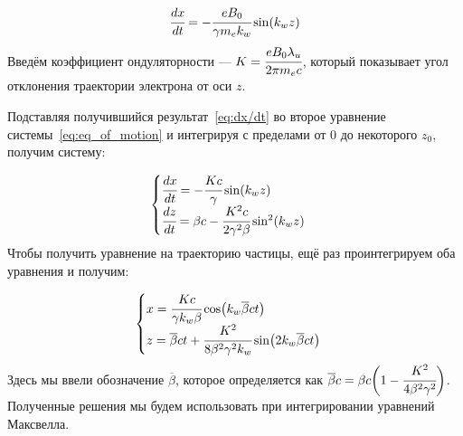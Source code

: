 \begin{equation}
 	\label{eq:dx/dt}
	\cfrac{dx}{dt} = - \cfrac{eB_0}{\gamma m_ek_w} \sin(k_w z)
\end{equation}
Введём коэффициент ондуляторности --- $K = \cfrac{eB_0 \lambda_u}{2 \pi m_e c}$, который показывает угол отклонения траектории электрона от оси $z$. 

Подставляя получившийся результат~\ref{eq:dx/dt} во второе уравнение системы~\ref{eq:eq_of_motion} и интегрируя с пределами от $0$ до некоторого $z_0$, получим систему:

\begin{equation}
	\begin{cases}
	\label{eq:eq_of_motion_velocity}
		\cfrac{dx}{dt} = - \cfrac{Kc}{\gamma} \sin(k_w z)\\
		\cfrac{dz}{dt} = \beta c - \cfrac{K^2 c}{2 \gamma^2 \beta}\sin^2(k_w z)
	\end{cases} 
\end{equation}
Чтобы получить уравнение на траекторию частицы, ещё раз проинтегрируем оба уравнения и получим:

\begin{equation}
	\begin{cases}
	\label{eq:eq_of_motion_trej}
		x = \cfrac{Kc}{\gamma k_w \beta} \cos(k_w\overline{\beta}ct)\\
		z = \overline{\beta}ct + \cfrac{K^2}{8 \beta^2 \gamma^2 k_w}\sin(2k_w\overline{\beta}ct) 
	\end{cases} 
\end{equation}
Здесь мы ввели обозначение $\overline{\beta}$, которое определяется как $\overline{\beta}c = \beta c\bigg(1 - \cfrac{K^2}{4 \beta^2 \gamma^2}\bigg)$. Полученные решения мы будем использовать при интегрировании уравнений Максвелла.
